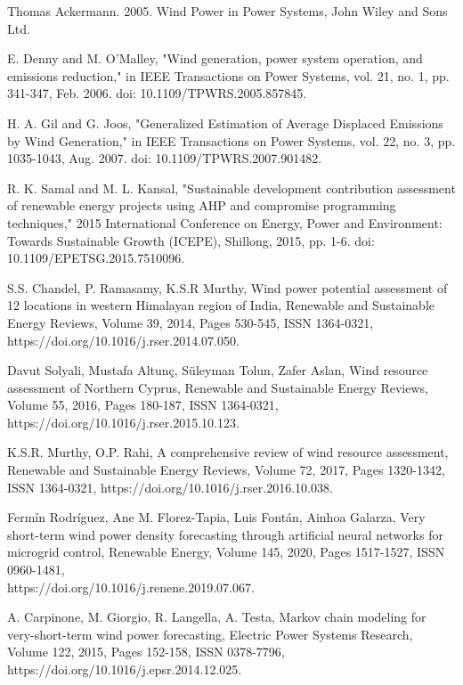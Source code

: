 \begin{thebibliography}{99}
\begin{singlespace}
 Thomas Ackermann. 2005. Wind Power in Power Systems, John Wiley and Sons Ltd.


E. Denny and M. O'Malley, "Wind generation, power system operation, and emissions reduction," in IEEE Transactions on Power Systems, vol. 21, no. 1, pp. 341-347, Feb. 2006. doi: 10.1109/TPWRS.2005.857845.

H. A. Gil and G. Joos, "Generalized Estimation of Average Displaced Emissions by Wind Generation," in IEEE Transactions on Power Systems, vol. 22, no. 3, pp. 1035-1043, Aug. 2007. doi: 10.1109/TPWRS.2007.901482.

 R. K. Samal and M. L. Kansal, "Sustainable development contribution assessment of renewable energy projects using AHP and compromise programming techniques," 2015 International Conference on Energy, Power and Environment: Towards Sustainable Growth (ICEPE), Shillong, 2015, pp. 1-6. doi: 10.1109/EPETSG.2015.7510096.


 S.S. Chandel, P. Ramasamy, K.S.R Murthy, Wind power potential assessment of 12 locations in western Himalayan region of India, Renewable and Sustainable Energy Reviews, Volume 39, 2014, Pages 530-545, ISSN 1364-0321, https://doi.org/10.1016/j.rser.2014.07.050. 

Davut Solyali, Mustafa Altunç, Süleyman Tolun, Zafer Aslan, Wind resource assessment of Northern Cyprus, Renewable and  Sustainable Energy Reviews, Volume 55, 2016, Pages 180-187, ISSN 1364-0321, https://doi.org/10.1016/j.rser.2015.10.123.

 K.S.R. Murthy, O.P. Rahi, A comprehensive review of wind resource assessment, Renewable and Sustainable Energy Reviews, Volume 72, 2017, Pages 1320-1342, ISSN 1364-0321, https://doi.org/10.1016/j.rser.2016.10.038.

 Fermín Rodríguez, Ane M. Florez-Tapia, Luis Fontán, Ainhoa Galarza, Very short-term wind power density forecasting through artificial neural networks for microgrid control, Renewable Energy, Volume 145, 2020, Pages 1517-1527, ISSN 0960-1481, \\ https://doi.org/10.1016/j.renene.2019.07.067.

 A. Carpinone, M. Giorgio, R. Langella, A. Testa, Markov chain modeling for very-short-term wind power forecasting, Electric Power Systems Research, Volume 122, 2015, Pages 152-158, ISSN 0378-7796, https://doi.org/10.1016/j.epsr.2014.12.025.


\end{singlespace}
\end{thebibliography}
